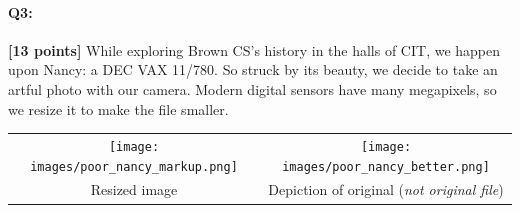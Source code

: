 \documentclass[11pt]{article}
\begin{document}
\begin{enumerate}[(a)]
\begin{tcolorbox}[colback=white!5!white,colframe=green!75!black,breakable]
{{    %
    }}
\end{tcolorbox}

\end{enumerate}


\pagebreak

\paragraph{Q3:} \textbf{[13 points]} While exploring Brown CS's history in the halls of CIT, we happen upon Nancy: a DEC VAX 11/780. So struck by its beauty, we decide to take an artful photo with our camera. Modern digital sensors have many megapixels, so we resize it to make the file smaller.

\begin{tabular}{c c}
\texttt{[image: images/poor\_nancy\_markup.png]} &
\texttt{[image: images/poor\_nancy\_better.png]} \\
Resized image & Depiction of original (\emph{not original file})
\end{tabular}

\end{document}
